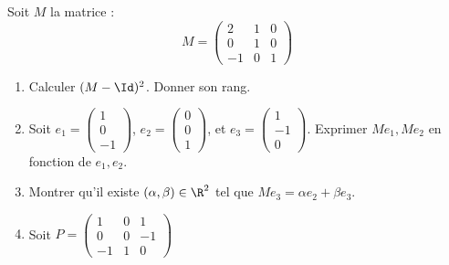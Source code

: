 \documentclass[a4paper, 11pt,reqno]{article}
\begin{document}
\begin{exercice}
Soit $M$ la matrice : 
$$M=\left( \begin{array}{ccc}
2 &1& 0\\
0 &1 & 0  \\
 -1&0&1
\end{array}\right) $$

\begin{enumerate}
\item Calculer $(M- \Id)^2$. Donner son rang.

 \item Soit $e_1= \left(
\begin{array}{c}
1\\
0\\
-1
\end{array}
 \right)$,  $e_2= \left(
\begin{array}{c}
0\\
0\\
1
\end{array}
 \right)$, et  $e_3= \left(
\begin{array}{c}
1\\
-1\\
0
\end{array}
 \right)$.
Exprimer  $Me_1, Me_2$ en fonction de $e_1, e_2$.
\item Montrer qu'il existe $(\alpha, \beta)\in \R^2$ tel que $M e_3 = \alpha e_2 +\beta e_3$.
 
\item Soit $P= \left(
\begin{array}{ccc}
1&0&1\\
0&0&-1\\
-1&1&0
\end{array}
 \right)$ 
 

\end{enumerate}
\end{exercice}
\end{document}
